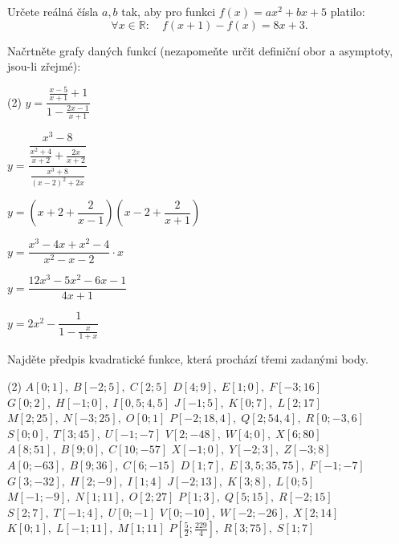 \documentclass[12pt,a4paper]{article}
\begin{document}
\begin{exercise}
Určete reálná čísla \(a,b\) tak, aby pro funkci \(f(x)=ax^2+bx+5\) platilo:
\[
\forall x\in\mathbb{R}:\quad f(x+1)-f(x)=8x+3.
\]
\end{exercise}

\begin{exercise}
Načrtněte grafy daných funkcí (nezapomeňte určit definiční obor a asymptoty, jsou-li zřejmé):

\begin{tasks}(2)
  \task $y = \dfrac{\frac{x - 5}{x + 1} + 1}{1 - \frac{2x - 1}{x + 1}}$
  
  \task $y = \dfrac{\dfrac{x^3 - 8}{\frac{x^2 + 4}{x + 2} + \frac{2x}{x + 2}}}{\frac{x^3 + 8}{(x - 2)^2 + 2x}}$
  
  \task $y = \left(x + 2 + \dfrac{2}{x - 1}\right) \left(x - 2 + \dfrac{2}{x + 1}\right)$
  
  \task $y = \dfrac{x^3 - 4x + x^2 - 4}{x^2 - x - 2} \cdot x$
  
  \task $y = \dfrac{12x^3 - 5x^2 - 6x - 1}{4x + 1}$
  
  \task $y = 2x^2 - \dfrac{1}{1 - \frac{x}{1 + x}}$
\end{tasks}
\end{exercise}


\begin{exercise}
Najděte předpis kvadratické funkce, která prochází třemi zadanými body.

\begin{tasks}(2)
  \task $A[0;1],\; B[-2;5],\; C[2;5]$
  \task $D[4;9],\; E[1;0],\; F[-3;16]$
  \task $G[0;2],\; H[-1;0],\; I[0{,}5;4{,}5]$
  \task $J[-1;5],\; K[0;7],\; L[2;17]$
  \task $M[2;25],\; N[-3;25],\; O[0;1]$
  \task $P[-2;18{,}4],\; Q[2;54{,}4],\; R[0;-3{,}6]$
  \task $S[0;0],\; T[3;45],\; U[-1;-7]$
  \task $V[2;-48],\; W[4;0],\; X[6;80]$
  \task $A[8;51],\; B[9;0],\; C[10;-57]$
  \task $X[-1;0],\; Y[-2;3],\; Z[-3;8]$
  \task $A[0;-63],\; B[9;36],\; C[6;-15]$
  \task $D[1;7],\; E[3{,}5;35{,}75],\; F[-1;-7]$
  \task $G[3;-32],\; H[2;-9],\; I[1;4]$
  \task $J[-2;13],\; K[3;8],\; L[0;5]$
  \task $M[-1;-9],\; N[1;11],\; O[2;27]$
  \task $P[1;3],\; Q[5;15],\; R[-2;15]$
  \task $S[2;7],\; T[-1;4],\; U[0;-1]$
  \task $V[0;-10],\; W[-2;-26],\; X[2;14]$
  \task $K[0;1],\; L[-1;11],\; M[1;11]$
  \task $P\!\left[\frac{5}{2};\frac{229}{4}\right],\; R[3;75],\; S[1;7]$
\end{tasks}

\end{exercise}
\end{document}
